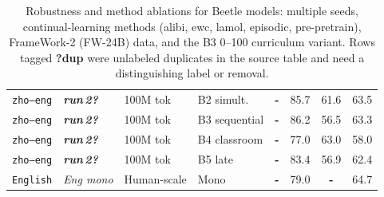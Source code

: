 \begin{table}[t]
\begin{tabular}{lll l cc cc}
\texttt{zho--eng} & \textit{\textbf{run\,2?}} & 100M tok & B2 simult. & \textbf{-} & \cellcolor[rgb]{0.805,1.000,0.805} 85.7 & \cellcolor[rgb]{0.918,1.000,0.918} 61.6 & \cellcolor[rgb]{0.889,1.000,0.889} 63.5 \\
\texttt{zho--eng} & \textit{\textbf{run\,2?}} & 100M tok & B3 sequential & \textbf{-} & \cellcolor[rgb]{0.803,1.000,0.803} 86.2 & \cellcolor[rgb]{0.954,1.000,0.954} 56.5 & \cellcolor[rgb]{0.891,1.000,0.891} 63.3 \\
\texttt{zho--eng} & \textit{\textbf{run\,2?}} & 100M tok & B4 classroom & \textbf{-} & \cellcolor[rgb]{0.853,1.000,0.853} 77.0 & \cellcolor[rgb]{0.908,1.000,0.908} 63.0 & \cellcolor[rgb]{0.934,1.000,0.934} 58.0 \\
\texttt{zho--eng} & \textit{\textbf{run\,2?}} & 100M tok & B5 late & \textbf{-} & \cellcolor[rgb]{0.818,1.000,0.818} 83.4 & \cellcolor[rgb]{0.951,1.000,0.951} 56.9 & \cellcolor[rgb]{0.898,1.000,0.898} 62.4 \\
\texttt{English} & \textit{Eng mono} & Human-scale & Mono & \textbf{-} & \cellcolor[rgb]{0.842,1.000,0.842} 79.0 & \textbf{-} & \cellcolor[rgb]{0.879,1.000,0.879} 64.7 \\
\bottomrule
\end{tabular}
\caption{Robustness and method ablations for Beetle models: multiple seeds, continual-learning methods (alibi, ewc, lamol, episodic, pre-pretrain), FrameWork-2 (FW-24B) data, and the B3 0--100 curriculum variant. Rows tagged \textbf{?dup} were unlabeled duplicates in the source table and need a distinguishing label or removal.}
\label{tab:beetle_ablations}
\end{table}

